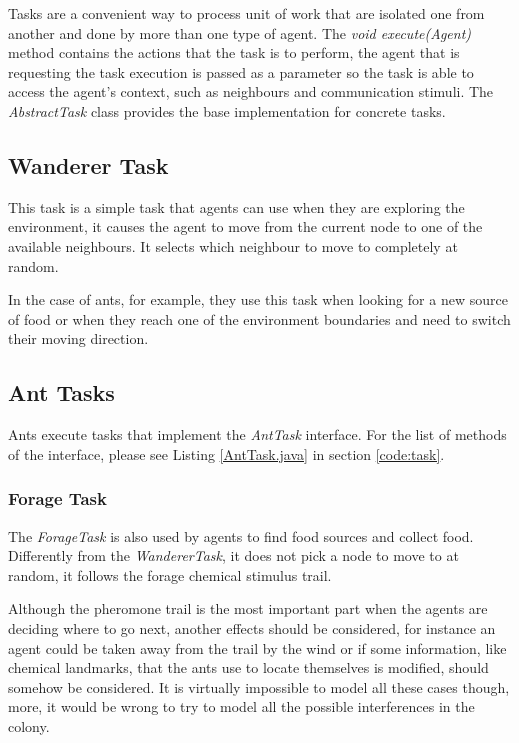 Tasks are a convenient way to process unit of work that are isolated one from another and done by more than one type of agent. The \emph{void execute(Agent)} method contains the actions that the task is to perform, the agent that is requesting the task execution is passed as a parameter so the task is able to access the agent's context, such as neighbours and communication stimuli. The \emph{AbstractTask} class provides the base implementation for concrete tasks.

\subsection{Wanderer Task}
\label{sec:wanderer-task}

This task is a simple task that agents can use when they are exploring the environment, it causes the agent to move from the current node to one of the available neighbours. It selects which neighbour to move to completely at random.

In the case of ants, for example, they use this task when looking for a new source of food or when they reach one of the environment boundaries and need to switch their moving direction.

\subsection{Ant Tasks}
\label{sec:ant-tasks}

Ants execute tasks that implement the \emph{AntTask} interface. For the list of methods of the interface, please see Listing \ref{AntTask.java} in section \ref{code:task}.

\subsubsection{Forage Task}
\label{task:forage}

The \emph{ForageTask} is also used by agents to find food sources and collect food. Differently from the \emph{WandererTask}, it does not pick a node to move to at random, it follows the forage chemical stimulus trail.

Although the pheromone trail is the most important part when the agents are deciding where to go next, another effects should be considered, for instance an agent could be taken away from the trail by the wind or if some information, like chemical landmarks, that the ants use to locate themselves is modified, should somehow be considered. It is virtually impossible to model all these cases though, more, it would be wrong to try to model all the possible interferences in the colony.

